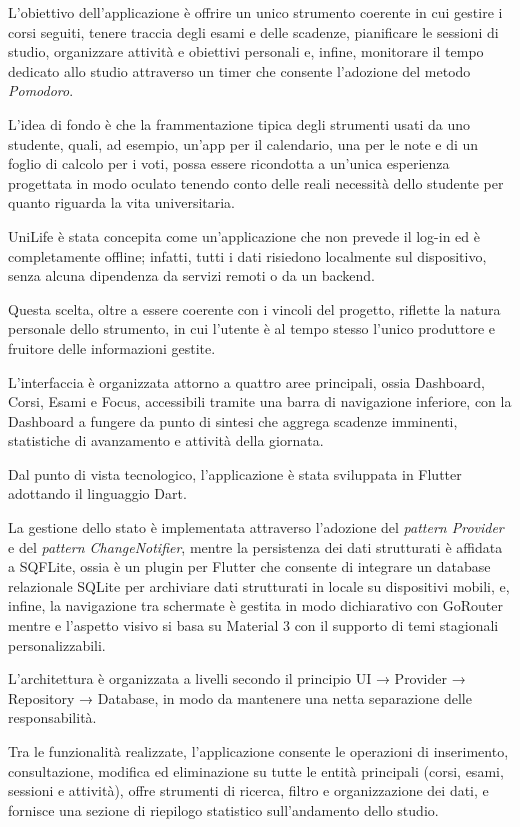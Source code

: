 \documentclass[a4paper, 12pt]{article}
\begin{document}
L'obiettivo dell'applicazione è offrire un unico strumento coerente in cui gestire i corsi seguiti, tenere traccia degli esami e delle scadenze, pianificare le sessioni di studio, organizzare attività e obiettivi personali e, infine, monitorare il tempo dedicato allo studio attraverso un timer che consente l'adozione del metodo \emph{Pomodoro}. 

L'idea di fondo è che la frammentazione tipica degli strumenti usati da uno studente, quali, ad esempio, un'app per il calendario, una per le note e di un foglio di calcolo per i voti, possa essere ricondotta a un'unica esperienza progettata in modo oculato tenendo conto delle reali necessità dello studente per quanto riguarda la vita universitaria.

UniLife è stata concepita come un'applicazione che non prevede il log-in ed è completamente offline; infatti, tutti i dati risiedono localmente sul dispositivo, senza alcuna dipendenza da servizi remoti o da un backend. 

Questa scelta, oltre a essere coerente con i vincoli del progetto, riflette la natura personale dello strumento, in cui l'utente è al tempo stesso l'unico produttore e fruitore delle informazioni gestite. 

L'interfaccia è organizzata attorno a quattro aree principali, ossia Dashboard, Corsi, Esami e Focus, accessibili tramite una barra di navigazione inferiore, con la Dashboard a fungere da punto di sintesi che aggrega scadenze imminenti, statistiche di avanzamento e attività della giornata.


Dal punto di vista tecnologico, l'applicazione è stata sviluppata in Flutter adottando il linguaggio Dart. 

La gestione dello stato è implementata attraverso l'adozione del \emph{pattern Provider} e del \emph{pattern ChangeNotifier}, mentre la persistenza dei dati strutturati è affidata a SQFLite, ossia è un plugin per Flutter che consente di integrare un database relazionale SQLite per archiviare dati strutturati in locale su dispositivi mobili, e, infine, la navigazione tra schermate è gestita in modo dichiarativo con GoRouter mentre e l'aspetto visivo si basa su Material 3 con il supporto di temi stagionali personalizzabili. 

L'architettura è organizzata a livelli secondo il principio UI → Provider → Repository → Database, in modo da mantenere una netta separazione delle responsabilità.


Tra le funzionalità realizzate, l'applicazione consente le operazioni di inserimento, consultazione, modifica ed eliminazione su tutte le entità principali (corsi, esami, sessioni e attività), offre strumenti di ricerca, filtro e organizzazione dei dati, e fornisce una sezione di riepilogo statistico sull'andamento dello studio. 
\end{document}
